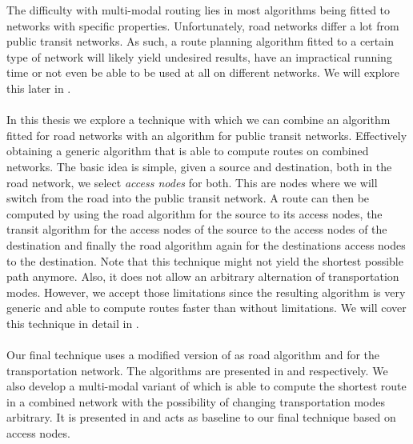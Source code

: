 	The difficulty with multi-modal routing lies in most algorithms being fitted to networks with specific properties.
	Unfortunately, road networks differ a lot from public transit networks. As such, a route planning algorithm
	fitted to a certain type of network will likely yield undesired results, have an impractical running time or not
	even be able to be used at all on different networks. We will explore this later in .\\\\
	In this thesis we explore a technique with which we can combine an algorithm fitted for road networks with an algorithm
	for public transit networks. Effectively obtaining a generic algorithm that is able to compute routes on combined networks.
	The basic idea is simple, given a source and destination, both in the road network, we select \textit{access nodes} for both.
	This are nodes where we will switch from the road into the public transit network. A route can then be computed by
	using the road algorithm for the source to its access nodes, the transit algorithm for the access nodes of the source
	to the access nodes of the destination and finally the road algorithm again for the destinations access nodes to
	the destination. Note that this technique might not yield the shortest possible path anymore. Also, it does not allow
	an arbitrary alternation of transportation modes. However, we accept those limitations since the resulting
	algorithm is very generic and able to compute routes faster than without limitations. We will cover this technique in detail
	in .\\\\
	Our final technique uses a modified version of \alt as road algorithm and \csa for the transportation network.
	The algorithms are presented in  and  respectively.
	We also develop a multi-modal variant of \dijkstra which is able to compute the shortest route in a combined
	network with the possibility of changing transportation modes arbitrary. It is presented in 
	and acts as baseline to our final technique based on access nodes.
	
